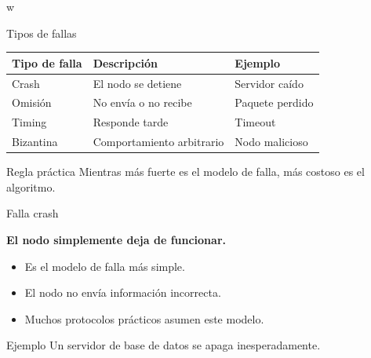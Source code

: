 w\documentclass[aspectratio=169]{beamer}
\begin{document}
\begin{frame}{Tipos de fallas}

\begin{table}
\centering
\begin{tabular}{lll}
\toprule
\textbf{Tipo de falla} & \textbf{Descripción} & \textbf{Ejemplo} \\
\midrule
Crash & El nodo se detiene & Servidor caído \\
Omisión & No envía o no recibe & Paquete perdido \\
Timing & Responde tarde & Timeout \\
Bizantina & Comportamiento arbitrario & Nodo malicioso \\
\bottomrule
\end{tabular}
\end{table}

\vspace{0.5cm}

\begin{block}{Regla práctica}
Mientras más fuerte es el modelo de falla, más costoso es el algoritmo.
\end{block}

\end{frame}

\begin{frame}{Falla crash}

\Large

\begin{center}
\textbf{El nodo simplemente deja de funcionar.}
\end{center}

\vspace{0.7cm}

\normalsize

\begin{itemize}
    \item Es el modelo de falla más simple.
    \item El nodo no envía información incorrecta.
    \item Muchos protocolos prácticos asumen este modelo.
\end{itemize}

\vspace{0.5cm}

\begin{exampleblock}{Ejemplo}
Un servidor de base de datos se apaga inesperadamente.
\end{exampleblock}

\end{frame}
\end{document}
